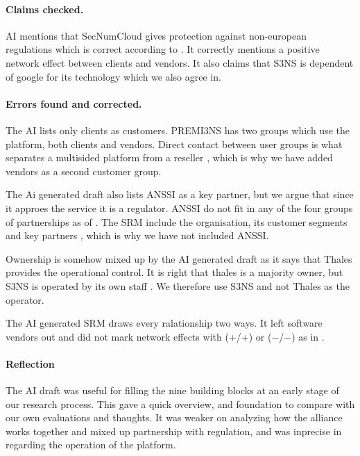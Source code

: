 \paragraph{Claims checked.}
AI mentions that SecNumCloud gives protection against non-european regulations which is correct according to \parencite{s3ns2025premi3ns}. It correctly mentions a positive network effect between clients and vendors. It also claims that S3NS is dependent of google for its technology which we also agree in. 

\paragraph{Errors found and corrected.}
The AI lists only clients as customers. PREMI3NS has two groups which use the platform, both clients and vendors. Direct contact between user groups is what separates a multisided platform from a reseller \parencite[slide 40]{windekilde2026msp}, which is why we have added vendors as a second customer group. 

The Ai generated draft also lists ANSSI as a key partner, but we argue that since it approes the service it is a regulator. ANSSI do not fit in any of the four groups of partnerships as of \parencite[p.~38]{osterwalder2010}. The SRM include the organisation, its customer segments and key partners \parencite[slide 30]{windekilde2026}, which is why we have not included ANSSI. 

Ownership is somehow mixed up by the AI generated draft as it says that Thales provides the operational control. It is right that thales is a majority owner, but S3NS is operated by its own staff \parencite{s3ns2025premi3ns}. We therefore use S3NS and not Thales as the operator. 

The AI generated SRM draws every ralationship two ways. It left software vendors out and did not mark network effects with (+/+) or ($-$/$-$) as in
\textcite[pp.~288--289]{overby2021}.

\paragraph{Reflection} The AI draft was useful for filling the nine building blocks at an early stage of our research process. This gave a quick overview, and foundation to compare with our own evaluations and thaughts. It was weaker on analyzing how the alliance works together and mixed up partnership with regulation, and was inprecise in regarding the operation of the platform. 